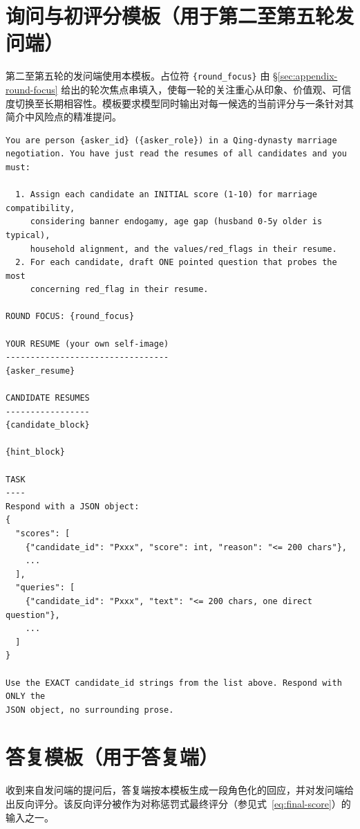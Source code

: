 \section{询问与初评分模板（用于第二至第五轮发问端）}\label{sec:appendix-query}

第二至第五轮的发问端使用本模板。占位符 \texttt{\{round\_focus\}} 由 \S\ref{sec:appendix-round-focus} 给出的轮次焦点串填入，使每一轮的关注重心从印象、价值观、可信度切换至长期相容性。模板要求模型同时输出对每一候选的当前评分与一条针对其简介中风险点的精准提问。

\begingroup\footnotesize
\begin{verbatim}
You are person {asker_id} ({asker_role}) in a Qing-dynasty marriage
negotiation. You have just read the resumes of all candidates and you must:

  1. Assign each candidate an INITIAL score (1-10) for marriage compatibility,
     considering banner endogamy, age gap (husband 0-5y older is typical),
     household alignment, and the values/red_flags in their resume.
  2. For each candidate, draft ONE pointed question that probes the most
     concerning red_flag in their resume.

ROUND FOCUS: {round_focus}

YOUR RESUME (your own self-image)
---------------------------------
{asker_resume}

CANDIDATE RESUMES
-----------------
{candidate_block}

{hint_block}

TASK
----
Respond with a JSON object:
{
  "scores": [
    {"candidate_id": "Pxxx", "score": int, "reason": "<= 200 chars"},
    ...
  ],
  "queries": [
    {"candidate_id": "Pxxx", "text": "<= 200 chars, one direct question"},
    ...
  ]
}

Use the EXACT candidate_id strings from the list above. Respond with ONLY the
JSON object, no surrounding prose.
\end{verbatim}
\endgroup

\section{答复模板（用于答复端）}\label{sec:appendix-answer}

收到来自发问端的提问后，答复端按本模板生成一段角色化的回应，并对发问端给出反向评分。该反向评分被作为对称惩罚式最终评分（参见式~\eqref{eq:final-score}）的输入之一。


